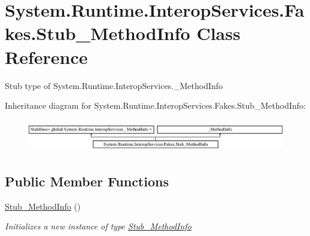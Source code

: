 \hypertarget{class_system_1_1_runtime_1_1_interop_services_1_1_fakes_1_1_stub___method_info}{\section{System.\-Runtime.\-Interop\-Services.\-Fakes.\-Stub\-\_\-\-Method\-Info Class Reference}
\label{class_system_1_1_runtime_1_1_interop_services_1_1_fakes_1_1_stub___method_info}
}


Stub type of System.\-Runtime.\-Interop\-Services.\-\_\-\-Method\-Info 


Inheritance diagram for System.\-Runtime.\-Interop\-Services.\-Fakes.\-Stub\-\_\-\-Method\-Info\-:\begin{figure}[H]
\begin{center}
\leavevmode
\includegraphics[height=1.435897cm]{class_system_1_1_runtime_1_1_interop_services_1_1_fakes_1_1_stub___method_info}
\end{center}
\end{figure}
\subsection*{Public Member Functions}
\begin{DoxyCompactItemize}
\item 
\hyperlink{class_system_1_1_runtime_1_1_interop_services_1_1_fakes_1_1_stub___method_info_add3d7713e144c4b263dabce5ac1ceae8}{Stub\-\_\-\-Method\-Info} ()
\begin{DoxyCompactList}\small\item\em Initializes a new instance of type \hyperlink{class_system_1_1_runtime_1_1_interop_services_1_1_fakes_1_1_stub___method_info}{Stub\-\_\-\-Method\-Info}\end{DoxyCompactList}\end{DoxyCompactItemize}
